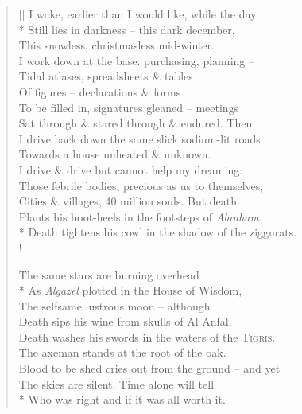 \settowidth{\versewidth}{Blood to be shed cries out from the ground -- and yet}
\begin{verse}[\versewidth]
    I wake, earlier than I would like, while the day\\*
    Still lies in darkness -- this dark december,\\
    This snowless, christmasless mid-winter.\\
    I work down at the base: purchasing, planning --\\
    Tidal atlases, spreadsheets \& tables\\
    Of figures -- declarations \& forms\\
    To be filled in, signatures gleaned -- meetings\\
    Sat through \& stared through \& endured. Then\\
    I drive back down the same slick sodium-lit roads\\
    Towards a house unheated \& unknown.\\
    I drive \& drive but cannot help my dreaming:\\
    Those febrile bodies, precious as us to themselves,\\
    Cities \& villages, 40 million souls. But death\\
    Plants his boot-heels in the footsteps of \textit{Abraham}.\\*
    Death tightens his cowl in the shadow of the ziggurats.\\!

    The same stars are burning overhead\\*
    As \textit{Algazel} plotted in the House of Wisdom,\\
    The selfsame lustrous moon -- although\\
    Death sips his wine from skulls of Al Anfal.\\
    Death washes his swords in the waters of the \textsc{Tigris}.\\
    The axeman stands at the root of the oak.\\
    Blood to be shed cries out from the ground -- and yet\\
    The skies are silent. Time alone will tell\\*
    Who was right and if it was all worth it.
\end{verse}
